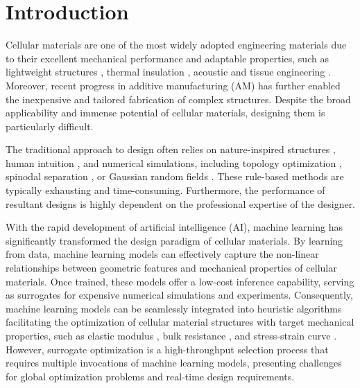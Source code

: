 \documentclass[preprint,review,12pt,authoryear]{elsarticle}
\begin{document}

\section{Introduction}
Cellular materials are one of the most widely adopted engineering materials due to their excellent mechanical performance and adaptable properties, such as lightweight structures \citep{Schaedler2011, Berger2017, Han2015, Tancogne-Dejean2018}, thermal insulation \citep{Li2021d}, acoustic \citep{Sekar2024} and tissue engineering \citep{Li2024c,Peng2023,Tabrizian2024}. Moreover,  recent progress in additive manufacturing (AM) has further enabled the inexpensive and tailored fabrication of complex structures. Despite the broad applicability and immense potential of cellular materials, designing them is particularly difficult.

The traditional approach to design often relies on nature-inspired structures \citep{Fernandes2021,Bandyopadhyay2021,Sethi2023}, human intuition \citep{Schaedler2011,Berger2017,Xu2016a}, and numerical simulations, including topology optimization \citep{Andersen2019,Bendsoe1999,Collet2018}, spinodal separation \citep{Hsieh2019,Roding2022}, or Gaussian random fields \citep{Kumar2020,Zheng2020abc}. These rule-based methods are typically exhausting and time-consuming. Furthermore, the performance of resultant designs is highly dependent on the professional expertise of the designer.
 
With the rapid development of artificial intelligence (AI), machine learning has significantly transformed the design paradigm of cellular materials. By learning from data, machine learning models can effectively capture the non-linear relationships between geometric features and mechanical properties of cellular materials. Once trained, these models offer a low-cost inference capability, serving as surrogates for expensive numerical simulations and experiments. Consequently, machine learning models can be seamlessly integrated into heuristic algorithms facilitating the optimization of cellular material structures with target mechanical properties, such as elastic modulus \citep{Garland2021,Lee2022,Chen2024b}, bulk resistance \citep{Liu2020a}, and stress-strain curve \citep{Deng2022a,Ma2020b}.  However, surrogate optimization is a high-throughput selection process that requires multiple invocations of machine learning models, presenting challenges for global optimization problems and real-time design requirements.
\end{document}
